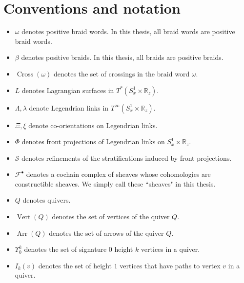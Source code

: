 \section{Conventions and notation}\label{sec_conventions}
\begin{itemize}[label={--}]
\item $\omega$ denotes positive braid words. In this thesis, all braid words are positive braid words.

\item $\beta$ denotes positive braids. In this thesis, all braids are positive braids.

\item $\operatorname{Cross}(\omega)$ denotes the set of crossings in the braid word $\omega$.

\item $L$ denotes Lagrangian surfaces in $T^*(S^1_x\times \mathbb{R}_z)$.

\item $\Lambda,\lambda$ denote Legendrian links in $T^\infty(S^1_x\times \mathbb{R}_z)$.

\item $\Xi,\xi$ denote co-orientations on Legendrian links.

\item $\Phi$ denotes front projections of Legendrian links on $S^1_x \times \mathbb{R}_z$.

\item $\mathcal{S}$ denotes refinements of the stratifications induced by front projections.

\item $\mathscr{F}^\bullet$ denotes a cochain complex of sheaves whose cohomologies are constructible sheaves. We simply call these ``sheaves" in this thesis.

\item $Q$ denotes quivers.

\item $\operatorname{Vert}(Q)$ denotes the set of vertices of the quiver $Q$.

\item $\operatorname{Arr}(Q)$ denotes the set of arrows of the quiver $Q$.

\item $\Upsilon^k_0$ denotes the set of signature $0$ height $k$ vertices in a quiver.

\item $I_k(v)$ denotes the set of height $1$ vertices that have paths to vertex $v$ in a quiver.


\end{itemize}
